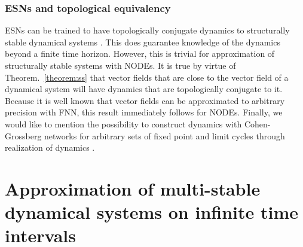 \documentclass{article}
\newcounter{ct}
\begin{document}


\subsubsection{ESNs and topological equivalency}%
ESNs can be trained to have  topologically conjugate dynamics to structurally stable dynamical systems  \citep{hart2020embedding}.
This does guarantee knowledge of the dynamics beyond a finite time horizon.
However, this is trivial for approximation of structurally stable systems with NODEs.
It is true by virtue of Theorem.~\ref{theorem:ss} that vector fields that are close to the vector field of a dynamical system will have dynamics that are topologically conjugate to it.
Because it is well known that vector fields can be approximated to arbitrary precision with FNN, this result immediately follows for NODEs.
Finally, we would like to mention the possibility to construct dynamics with Cohen-Grossberg networks for arbitrary sets of fixed point and limit cycles through realization of dynamics  \citep{cohen1992construction}.



\section{Approximation of multi-stable dynamical systems on infinite time intervals}
\end{document}
